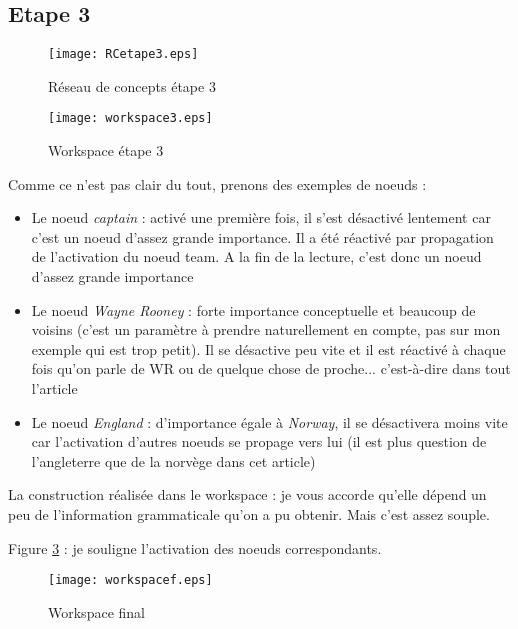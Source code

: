 \documentclass{article}           %
\begin{document}
 \subsection{Etape 3}

 \begin{figure}[htp]
 \centering
  \texttt{[image: RCetape3.eps]}
 \caption{Réseau de concepts étape 3}
 \label{fig:RC3}
\end{figure}
 
 \begin{figure}[htp]
 \centering
  \texttt{[image: workspace3.eps]}
 \caption{Workspace étape 3}
 \label{fig:W3}
\end{figure}

 
 Comme ce n'est pas clair du tout, prenons des exemples de noeuds :
 \begin{itemize}
  \item Le noeud \textit{captain} : activé une première fois, il s'est désactivé lentement car c'est un noeud d'assez grande importance. Il a été réactivé par propagation de l'activation du noeud team. A la fin de la lecture, c'est donc un noeud d'assez grande importance
  \item Le noeud \textit{Wayne Rooney} : forte importance conceptuelle et beaucoup de voisins (c'est un paramètre à prendre naturellement en compte, pas sur mon exemple qui est trop petit). Il se désactive peu vite et il est réactivé à chaque fois qu'on parle de WR ou de quelque chose de proche... c'est-à-dire dans tout l'article
  \item Le noeud \textit{England} : d'importance égale à \textit{Norway}, il se désactivera moins vite car l'activation d'autres noeuds se propage vers lui (il est plus question de l'angleterre que de la norvège dans cet article)
 \end{itemize}

La construction réalisée dans le workspace : je vous accorde qu'elle dépend un peu de l'information grammaticale qu'on a pu obtenir. Mais c'est assez souple.

Figure \ref{fig:Wf} : je souligne l'activation des noeuds correspondants.

\begin{figure}[htp]
 \centering
  \texttt{[image: workspacef.eps]}
 \caption{Workspace final}
 \label{fig:Wf}
\end{figure}
\end{document}
